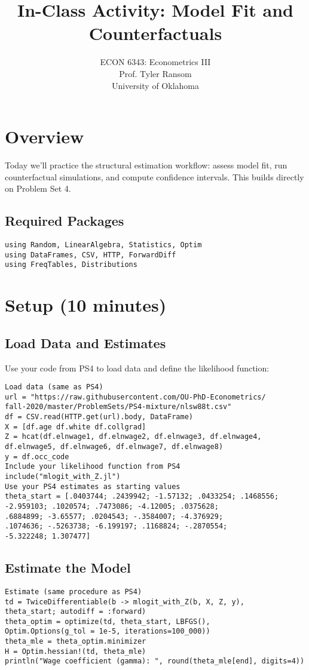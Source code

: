 \documentclass[12pt,english]{article}
\begin{document}
\title{In-Class Activity: Model Fit and Counterfactuals}
\author{ECON 6343: Econometrics III\\
Prof. Tyler Ransom\\
University of Oklahoma}
\date{}
\maketitle
\section*{Overview}
Today we'll practice the structural estimation workflow: assess model fit, run counterfactual simulations, and compute confidence intervals. This builds directly on Problem Set 4.
\subsection*{Required Packages}
\begin{verbatim}
using Random, LinearAlgebra, Statistics, Optim
using DataFrames, CSV, HTTP, ForwardDiff
using FreqTables, Distributions
\end{verbatim}
\section{Setup (10 minutes)}
\subsection{Load Data and Estimates}
Use your code from PS4 to load data and define the likelihood function:
\begin{verbatim}
Load data (same as PS4)
url = "https://raw.githubusercontent.com/OU-PhD-Econometrics/
fall-2020/master/ProblemSets/PS4-mixture/nlsw88t.csv"
df = CSV.read(HTTP.get(url).body, DataFrame)
X = [df.age df.white df.collgrad]
Z = hcat(df.elnwage1, df.elnwage2, df.elnwage3, df.elnwage4,
df.elnwage5, df.elnwage6, df.elnwage7, df.elnwage8)
y = df.occ_code
Include your likelihood function from PS4
include("mlogit_with_Z.jl")
Use your PS4 estimates as starting values
theta_start = [.0403744; .2439942; -1.57132; .0433254; .1468556;
-2.959103; .1020574; .7473086; -4.12005; .0375628;
.6884899; -3.65577; .0204543; -.3584007; -4.376929;
.1074636; -.5263738; -6.199197; .1168824; -.2870554;
-5.322248; 1.307477]
\end{verbatim}
\subsection{Estimate the Model}
\begin{verbatim}
Estimate (same procedure as PS4)
td = TwiceDifferentiable(b -> mlogit_with_Z(b, X, Z, y),
theta_start; autodiff = :forward)
theta_optim = optimize(td, theta_start, LBFGS(),
Optim.Options(g_tol = 1e-5, iterations=100_000))
theta_mle = theta_optim.minimizer
H = Optim.hessian!(td, theta_mle)
println("Wage coefficient (gamma): ", round(theta_mle[end], digits=4))
\end{verbatim}
\end{document}

